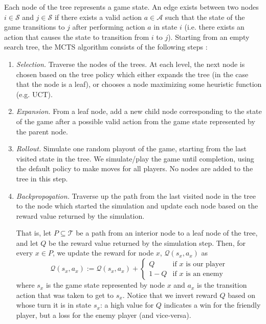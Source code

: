 \documentclass{paper}
\begin{document}
Each node of the tree represents a game state. An edge exists between two nodes $i\in\mathcal{S}$ and $j\in\mathcal{S}$ if there exists a valid action $a\in\mathcal{A}$ such that the state of the game transitions to $j$ after performing action $a$ in state $i$ (i.e. there exists an action that causes the state to transition from $i$ to $j$). Starting from an empty search tree, the MCTS algorithm consists of the following steps \cite{mcts:wikipedia}:
\begin{enumerate}
    \item\textit{Selection.} Traverse the nodes of the trees. At each level, the next node is chosen based on the tree policy which either expands the tree (in the case that the node is a leaf), or chooses a node maximizing some heuristic function (e.g. UCT). \item\textit{Expansion.} From a leaf node, add a new child node corresponding to the state of the game after a possible valid action from the game state represented by the parent node.
    \item\textit{Rollout.} Simulate one random playout of the game, starting from the last visited state in the tree. We simulate/play the game until completion, using the default policy to make moves for all players. No nodes are added to the tree in this step.
    \item\textit{Backpropogation.} Traverse up the path from the last visited node in the tree to the node which started the simulation and update each node based on the reward value returned by the simulation. 

    That is, let $P\subseteq\mathcal{T}$ be a path from an interior node to a leaf node of the tree, and let $Q$ be the reward value returned by the simulation step. Then, for every $x\in P$, we update the reward for node $x$, $\mathcal{Q}(s_x,a_x)$ as 
    \begin{equation*}
        \mathcal{Q}(s_x,a_x):=\mathcal{Q}(s_x,a_x)+\begin{cases}
        Q&\text{if $x$ is our player}\\
        1-Q&\text{if $x$ is an enemy}
        \end{cases}
    \end{equation*}
    where $s_x$ is the game state represented by node $x$ and $a_x$ is the transition action that was taken to get to $s_x$. Notice that we invert reward $Q$ based on whose turn it is in state $s_x$: a high value for $Q$ indicates a win for the friendly player, but a loss for the enemy player (and vice-versa). 
\end{enumerate}
\end{document}
